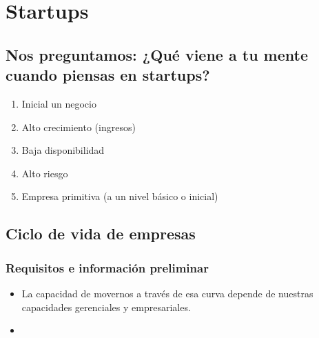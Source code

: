 \section{Startups}

\subsection{\textbf{Nos preguntamos:} ¿Qué viene a tu mente cuando piensas en startups?}
\begin{enumerate}
    \item Inicial un negocio 
    \item Alto crecimiento (ingresos)
    \item Baja disponibilidad 
    \item Alto riesgo 
    \item Empresa primitiva (a un nivel básico o inicial)
\end{enumerate}


\subsection{Ciclo de vida de empresas}

\subsubsection{Requisitos e información preliminar}
\begin{itemize}
    \item La capacidad de movernos a través de esa curva depende de nuestras capacidades gerenciales y empresariales.
    \item 
\end{itemize}

